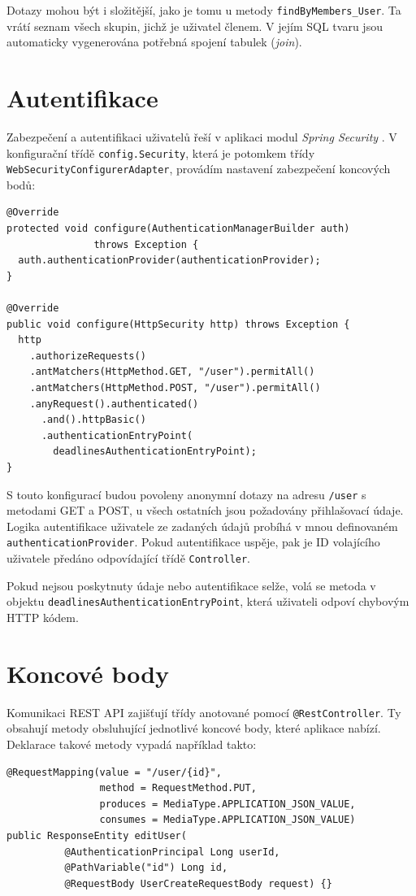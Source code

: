 \documentclass[thesis=B,czech]{FITthesis}[2012/06/26]
\begin{document}
	Dotazy mohou být i složitější, jako je tomu u metody \texttt{findByMembers\_User}. Ta vrátí seznam všech skupin, jichž je uživatel členem. V jejím  SQL tvaru jsou automaticky vygenerována potřebná spojení tabulek (\textit{join}).
	
	\section{Autentifikace}
		Zabezpečení a autentifikaci uživatelů řeší v aplikaci modul \textit{Spring Security} \cite{spring-security}. V konfigurační třídě \texttt{config.Security}, která je potomkem třídy \texttt{WebSecurityConfigurerAdapter}, provádím nastavení zabezpečení koncových bodů:
		\begin{Verbatim}
@Override
protected void configure(AuthenticationManagerBuilder auth) 
               throws Exception {
  auth.authenticationProvider(authenticationProvider);
}
		
@Override
public void configure(HttpSecurity http) throws Exception {
  http
    .authorizeRequests()
    .antMatchers(HttpMethod.GET, "/user").permitAll()
    .antMatchers(HttpMethod.POST, "/user").permitAll()
    .anyRequest().authenticated()
      .and().httpBasic()
      .authenticationEntryPoint(
        deadlinesAuthenticationEntryPoint);
}
		\end{Verbatim}
	
		S touto konfigurací budou povoleny anonymní dotazy na adresu \texttt{/user} s metodami GET a POST, u všech ostatních jsou požadovány přihlašovací údaje. Logika autentifikace uživatele ze zadaných údajů probíhá v mnou definovaném \texttt{authenticationProvider}. Pokud autentifikace uspěje, pak je ID volajícího uživatele předáno odpovídající třídě \texttt{Controller}.
	
		Pokud nejsou poskytnuty údaje nebo autentifikace selže, volá se metoda v objektu \texttt{deadlinesAuthenticationEntryPoint}, která uživateli odpoví chybovým HTTP kódem.
	
	\section{Koncové body}
		Komunikaci REST API zajišťují třídy anotované pomocí \texttt{@RestController}. Ty obsahují metody obsluhující jednotlivé koncové body, které aplikace nabízí. Deklarace takové metody vypadá například takto:
		\begin{Verbatim}
@RequestMapping(value = "/user/{id}", 
                method = RequestMethod.PUT, 
                produces = MediaType.APPLICATION_JSON_VALUE, 
                consumes = MediaType.APPLICATION_JSON_VALUE)
public ResponseEntity editUser(
          @AuthenticationPrincipal Long userId,
          @PathVariable("id") Long id,
          @RequestBody UserCreateRequestBody request) {}
		\end{Verbatim}
	
\end{document}
